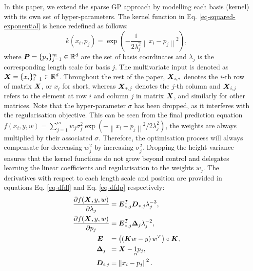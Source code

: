 \documentclass[useAMS,usenatbib,fleqn]{mn2e}
\begin{document}
In this paper, we extend the sparse GP approach by modelling each basis (kernel) with its own set of hyper-parameters. The kernel function in Eq. \eqref{eq-squared-exponential} is hence redefined as follows:
\begin{equation}
\label{eq-squared-exponential-extension}
k(x_{i},p_{j}) = \exp{\left(-\frac{1}{2\lambda_{j}^{2}}\left\| x_{i}-p_{j}\right\|^{2}\right)},
\end{equation}
where $\bmath{P}=\{p_{j}\}_{j=1}^{m} \in \mathbb{R}^{d}$ are the set of basis coordinates and $\lambda_{j}$ is the corresponding length scale for basis $j$. The multivariate input is denoted as $\bmath{X}=\{x_{i}\}_{i=1}^{n} \in \mathbb{R}^{d}$. Throughout the rest of the paper, $\bmath{X}_{i,*}$ denotes the $i$-th row of matrix $\bmath{X}$, or $x_{i}$ for short, whereas $\bmath{X}_{*,j}$ denotes the $j$-th column and $\bmath{X}_{i,j}$ refers to the element at row $i$ and column $j$ in matrix $\bmath{X}$, and similarly for other matrices. Note that the hyper-parameter $\sigma$ has been dropped, as it interferes with the regularisation objective. This can be seen from the final prediction equation $f(x_{i},y,w)=\sum_{j=1}^{m}w_{j}\sigma_{j}^{2}\exp{\left(-\left\| x_{i}-p_{j}\right\|^{2}/2\lambda_{j}^{2}\right)}$, the weights are always multiplied by their associated $\sigma$. Therefore, the optimisation process will always compensate for decreasing $w_{j}^{2}$ by increasing $\sigma_{j}^{2}$. Dropping the height variance ensures that the kernel functions do not grow beyond control and delegates learning the linear coefficients and regularisation to the weights $w_{j}$. The derivatives with respect to each length scale and position are provided in equations Eq. \eqref{eq-dfdl} and Eq. \eqref{eq-dfdp} respectively:
\begin{subequations}
\begin{align}
\label{eq-dfdl}
\frac{\partial f(\bmath{X},y,w)}{\partial \lambda_{j}} &=\bmath{E}_{*,j}^{T}\bmath{D}_{*,j}\lambda_{j}^{-3},\\
\label{eq-dfdp}
\frac{\partial f(\bmath{X},y,w)}{\partial p_{j}} &=\bmath{E}_{*,j}^{T}\mathbf\Delta_{j}\lambda_{j}^{-2},\\
\bmath{E}\phantom{_{i,j}} &= \left(\left(\bmath{K}w-y\right)w^{T}\right)\circ\bmath{K},\\
\mathbf\Delta_{j\phantom{,i}} &= \bmath{X}-\underset{n}{1}p_{j},\\
\bmath{D}_{i,j} &= \left \| x_{i}-p_{j}\right\|^{2}.
\end{align}
\end{subequations}
\end{document}
